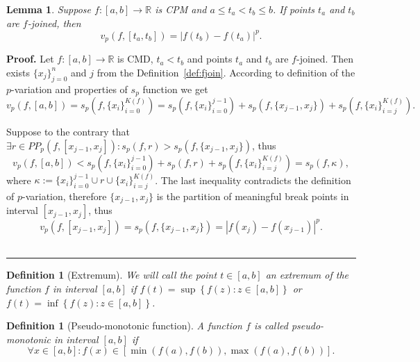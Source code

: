 \documentclass[12pt, a4paper]{article}
\newtheorem{lemma}[theorem]{Lemma}
\newtheorem{definition}[theorem]{Definition}
\newenvironment{proof}[1][Proof]{\noindent \textbf{#1.} }{\  \rule{0.5em}{0.5em}}
\numberwithin{equation}{section}
\begin{document}
\begin{lemma}\label{prop:fjoinPvar} 
  Suppose $f:[a,b] \rightarrow \mathbb{R}$ is CPM and $a \leq t_a<t_b \leq b$.
  If points $t_a$ and $t_b$ are $f$-joined, then 
  \begin{equation}
    v_p(f,[t_a,t_b])=|f(t_b)-f(t_a)|^p. 
  \end{equation}
\end{lemma}
\begin{proof} 
  Let $f:[a,b] \rightarrow \mathbb{R}$ is CMD, 
  $t_a<t_b$ and points $t_a$ and $t_b$ are $f$-joined. 
  Then exists $\{x_j\}_{j=0}^{n}$ and $j$ from the Definition~\ref{def:fjoin}.
  According to definition of the $p$-variation and properties of $s_p$ function we get
  \begin{equation}
  v_p(f,[a,b])= s_p(f,\{x_i\}_{i=0}^{K(f)}) = 
     s_p(f,\{x_i\}_{i=0}^{j-1}) + s_p(f,\{x_{j-1},x_j\}) + s_p(f,\{x_i\}_{i=j}^{K(f)}).
  \end{equation}
  
  Suppose to the contrary that $\exists r \in PP_{p}(f,[x_{j-1},x_j]): s_p(f,r)>s_p(f,\{x_{j-1},x_j\})$, thus
  \begin{equation}
    v_p(f,[a,b]) < s_p(f,\{x_i\}_{i=0}^{j-1}) + s_p(f,r) + s_p(f,\{x_i\}_{i=j}^{K(f)}) = s_p(f,\kappa),
  \end{equation}
  where $\kappa:=\{x_i\}_{i=0}^{j-1} \cup r \cup \{x_i\}_{i=j}^{K(f)}$.
  The last inequality contradicts the definition of $p$-variation, 
  therefore $\{x_{j-1},x_j\}$ is the partition of meaningful break points in interval $[x_{j-1},x_j]$, thus
  \begin{equation}
    v_p(f,[x_{j-1},x_j])=s_p(f,\{x_{j-1},x_j\})=|f(x_j)-f(x_{j-1})|^p.
  \end{equation}    
\end{proof}


\begin{definition}[Extremum]\label{def:extremum}
  We will call the point $t \in  [a,b]$ an \emph{extremum} of the function $f$ in interval $[a,b]$ if   
  $f(t)=\sup \left\{ f(z):z\in \left[ a,b\right]
  \right\} $ or $f(t)=\inf \left\{ f(z):z\in \left[ a,b\right] \right\} $.
\end{definition}

\begin{definition}[Pseudo-monotonic function]\label{def:PsiaudoMon}
  A function $f$ is called \emph{pseudo-monotonic} in interval $[a,b]$ if
  \begin{equation}
    \forall x \in [a,b]: f(x) \in [\min(f(a),f(b)), \max(f(a),f(b))].  
  \end{equation}
\end{definition}
\end{document}
